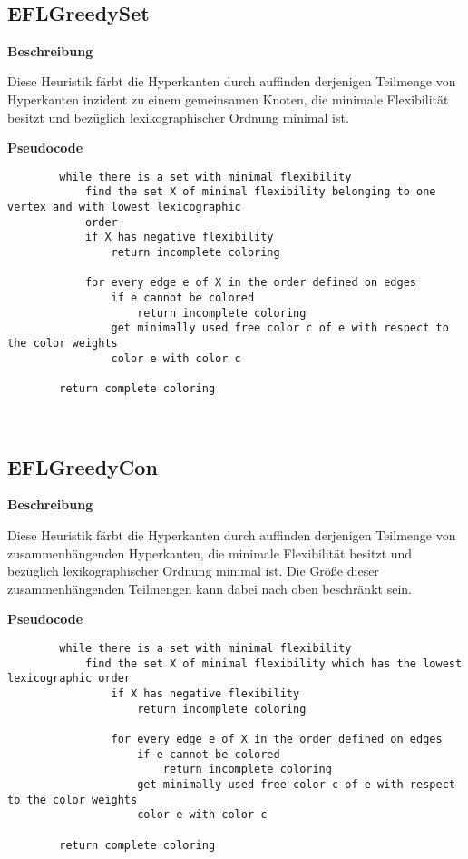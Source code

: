 \documentclass{article}
\begin{document}
	~\newline
	~\newline
	
	\subsection{EFLGreedySet}
	
	\textbf{Beschreibung}
	
	Diese Heuristik färbt die Hyperkanten durch auffinden derjenigen Teilmenge von Hyperkanten inzident zu einem gemeinsamen Knoten, die minimale Flexibilität besitzt und bezüglich lexikographischer Ordnung minimal ist.
	
	\textbf{Pseudocode}
	\begin{verbatim}  
		while there is a set with minimal flexibility
		    find the set X of minimal flexibility belonging to one vertex and with lowest lexicographic 
		    order
		    if X has negative flexibility
		        return incomplete coloring
		        
		    for every edge e of X in the order defined on edges
		        if e cannot be colored
		            return incomplete coloring
		        get minimally used free color c of e with respect to the color weights
		        color e with color c
				        
		return complete coloring
	\end{verbatim}
	
	~\newpage
	
	\subsection{EFLGreedyCon}
	
	\textbf{Beschreibung}
	
	Diese Heuristik färbt die Hyperkanten durch auffinden derjenigen Teilmenge von zusammenhängenden Hyperkanten, die minimale Flexibilität besitzt und bezüglich lexikographischer Ordnung minimal ist. Die Größe dieser zusammenhängenden Teilmengen kann dabei nach oben beschränkt sein.
	
	\textbf{Pseudocode}
	\begin{verbatim}    
		while there is a set with minimal flexibility
		    find the set X of minimal flexibility which has the lowest lexicographic order
		        if X has negative flexibility
		            return incomplete coloring
		            
		        for every edge e of X in the order defined on edges
		            if e cannot be colored
		                return incomplete coloring
		            get minimally used free color c of e with respect to the color weights
		            color e with color c
				        
		return complete coloring
	\end{verbatim}	
	
\end{document}

